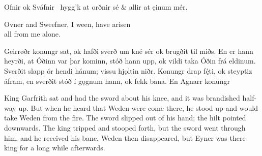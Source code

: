 \bvg
\bva{}Ofnir ok Sváfnir \hld\ hygg’k at orðnir sé &
\ind allir at ęinum mér.\eva

\bvb Ovner and Sweefner, I ween, have arisen \\
all from me alone.\evb
\evg


\bpg
\bpa{}Geirrøðr konungr sat, ok hafði sverð um kné sér ok brugðit til miðs. En er hann heyrði, at Óðinn var þar kominn, stóð hann upp, ok vildi taka Óðin frá eldinum. Sverðit slapp ór hendi hánum; vissu hjǫltin niðr. Konungr drap fę́ti, ok steyptiz áfram, en sverðit stóð í gǫgnum hann, ok fekk  bana.  En Agnarr  konungr \epa

\bpb King Garfrith sat and had the sword about his knee, and it was brandished half-way up. But when he heard that Weden were come there, he stood up and would take Weden from the fire. The sword slipped out of his hand; the hilt pointed downwards. The king tripped and stooped forth, but the sword went through him, and he received his bane. Weden then disappeared, but Eyner was there king for a long while afterwards.\epb
\epg
